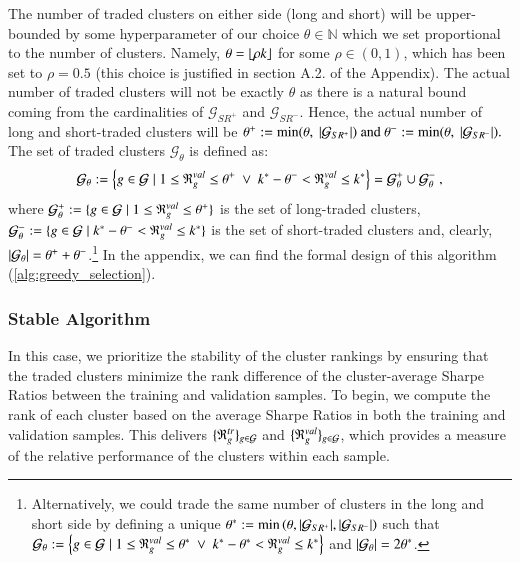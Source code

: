 \mx
The number of traded clusters on either side (long and short) will be upper-bounded by some hyperparameter of our choice $\theta \in \mathbb{N}$
which we set proportional to the number of clusters. Namely, $\theta =\lfloor \rho k \rfloor$ for some $\rho\in(0,1)$, which has been set to $\rho=0.5$ (this choice is justified in section A.2. of the Appendix).
%
The actual number of traded clusters will not be exactly $\theta$ as there is a natural bound coming from the cardinalities of $\mathcal G_{SR^+}$ and $\mathcal G_{SR^-}$. Hence, the actual number of long and short-traded clusters will be
$
\theta^+ := \min(\theta, ~|\mathcal G_{SR^+}|)
~\text{and}~
\theta^- := \min(\theta, ~|\mathcal G_{SR^-}|)
.
$
The set of traded clusters $\mathcal G_{\theta}$ is defined as:
$$
\mathcal{G}_\theta := 
\left\{
g \in \mathcal G 
\mid 
1\leq \mathfrak{R}_g^{val} \leq \theta^+
~\vee~ 
k^* -\theta^- < \mathfrak{R}_g^{val} \leq k^*
\right\} 
= 
\mathcal{G}_{\theta}^+ \cup \mathcal{G}_{\theta}^-
~,
$$
where
$
\mathcal{G}_{\theta}^+ := 
\{ g \in\mathcal{G} \mid 
1\leq \mathfrak{R}_g^{val} \leq \theta^+
\}
$
is the set of long-traded clusters,
$
\mathcal{G}_{\theta}^- := 
\{ g \in\mathcal{G} \mid 
k^*-\theta^-
< \mathfrak{R}_g^{val} \leq 
k^*
\}
$
is the set of short-traded clusters 
and, clearly, $\left|\mathcal{G}_{\theta}\right|=\theta^+ + \theta^- $.\footnote{
Alternatively, we could trade the same number of clusters in the long and short side by defining a unique 
$
\theta^* := \min\left(\theta, |\mathcal G_{SR^+}|, |\mathcal G_{SR^-}| \right)
$
such that
$
\mathcal{G}_\theta := 
\left\{
g \in \mathcal G 
\mid 
1\leq \mathfrak{R}_g^{val} \leq \theta^*
~\vee~ 
k^*-\theta^* < \mathfrak{R}_g^{val} \leq k^*
\right\} 
$
and 
$\left|\mathcal{G}_\theta\right|=2\theta^*$.
}
In the appendix, we can find the formal design of this algorithm (\cref{alg:greedy_selection}).

\subsubsection{Stable Algorithm}

In this case, we prioritize the stability of the cluster rankings by ensuring that the traded clusters minimize the rank difference of the cluster-average Sharpe Ratios between the training and validation samples. 
To begin, we compute the rank of each cluster based on the average Sharpe Ratios in both the training and validation samples. This delivers $\{\mathfrak{R}_g^{tr}\}_{g\in\mathcal{G}}$ and $\{\mathfrak{R}_g^{val}\}_{g\in\mathcal{G}}$, which provides a measure of the relative performance of the clusters within each sample.


